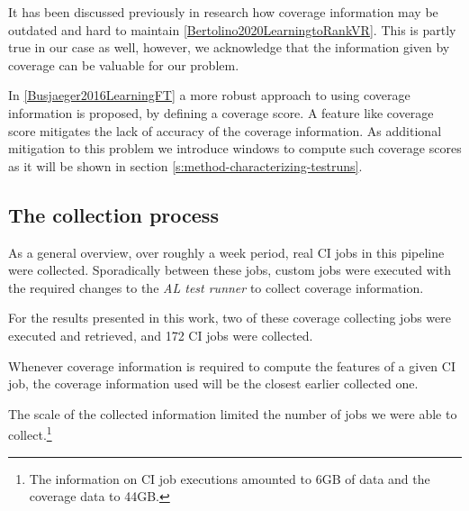 It has been discussed previously in research how coverage information may be
outdated and hard to maintain \ref{Bertolino2020LearningtoRankVR}. This is 
partly true in our case as well, however, we acknowledge that the information 
given by coverage can be valuable for our problem.

In \ref{Busjaeger2016LearningFT} a more robust approach to using coverage information is proposed, by defining
a coverage score. A feature like coverage score mitigates the lack of accuracy 
of the coverage information. As additional mitigation to this problem we introduce
windows to compute such coverage scores as it will be shown in section \ref{s:method-characterizing-testruns}.

\subsection{The collection process}

As a general overview, over roughly a week period, real CI jobs in this pipeline were collected. 
Sporadically between these jobs, custom jobs were executed with the required changes
to the \emph{AL test runner} to collect coverage information. 

For the results presented in this work, two of these coverage collecting jobs were 
executed and retrieved, and 172 CI jobs were collected.

Whenever coverage information is required to compute the features of a given CI job,
the coverage information used will be the closest earlier collected one.

The scale of the collected information limited the number of jobs we were able to
collect.\footnote{The information on CI job executions amounted to 6GB of data and 
the coverage data to 44GB. }